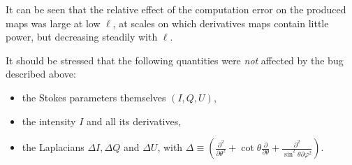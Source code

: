 It can be seen that the relative effect of the computation error on the produced maps was
large at low $\ell$, at scales on which derivatives maps contain little power, but decreasing
steadily with $\ell$.


\vskip 1cm
It should be stressed that the following quantities were {\em not} affected by
the bug described above:
\begin{itemize}
\item the Stokes parameters themselves $(I,Q,U)$,
\item the intensity $I$ and all its derivatives,
\item the Laplacians $\Delta I, \Delta Q$ and $\Delta U$, with
$\Delta \equiv \left(
\frac{\partial^2}{\partial\theta^2}
+ \cot\theta\frac{\partial}{\partial\theta} + 
\frac{\partial^2}{\sin^2\theta\partial\varphi^2} 
\right)$.
\end{itemize}
